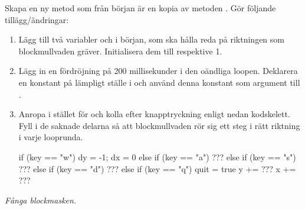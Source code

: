 \Subtask
Skapa en ny metod  som från början är en kopia av metoden . Gör följande tillägg/ändringar:
\begin{enumerate}

\item Lägg till två variabler  och  i början, som ska hålla reda på riktningen som blockmullvaden gräver. Initialisera dem till  respektive {1}.

\item Lägg in en fördröjning på 200 millisekunder i den oändliga loopen. Deklarera en konstant  på lämpligt ställe i  och använd denna konstant som argument till .

\item Anropa  i stället för  och kolla efter knapptryckning enligt nedan kodskelett. Fyll i de saknade delarna så att blockmullvaden rör sig ett steg i rätt riktning i varje looprunda.
\begin{Code}
      if      (key == "w") { dy = -1; dx = 0 }
      else if (key == "a") { ??? }
      else if (key == "s") { ??? }
      else if (key == "d") { ??? }
      else if (key == "q") { quit = true }
      y += ???
      x += ???
\end{Code}


%

\end{enumerate}

\Task\label{lab:blockmole:task:blockworm} \emph{Fånga blockmasken.}


